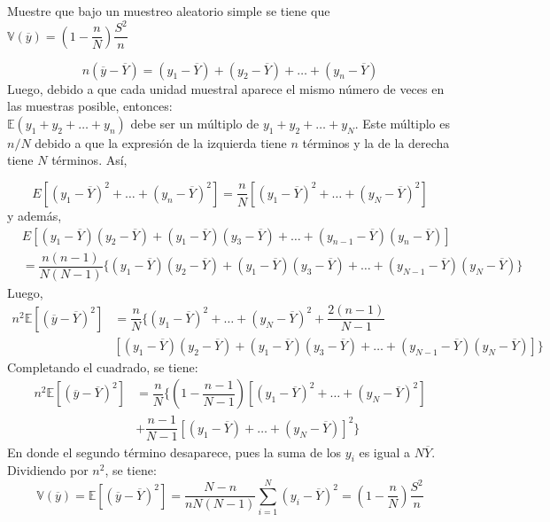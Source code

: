 \addpoints
\question[10] Muestre que bajo un muestreo aleatorio simple se tiene que $\mathbb{V}(\overline{y})=\left(1-\dfrac{n}{N}\right) \dfrac{S^2}{n}$

\begin{solution}
$$n(\overline{y}-\overline{Y})=(y_1-\overline{Y})+(y_2-\overline{Y})+\dots+(y_n-\overline{Y})$$
Luego, debido a que cada unidad muestral aparece el mismo número de veces en las muestras posible, entonces:\\
$\mathbb{E}(y_1+y_2+\dots+y_n)$ debe ser un múltiplo de $y_1+y_2+\dots+y_N$. Este múltiplo es $n/N$ debido a que la expresión de la izquierda tiene $n$ términos y la de la derecha tiene $N$ términos. Así,

$$E\left[(y_1-\overline{Y})^2+\dots+(y_n-\overline{Y})^2\right]=\dfrac{n}{N}\left[(y_1-\overline{Y})^2+\dots+(y_N-\overline{Y})^2\right]$$
y además,
\begin{align*}
&E\left[(y_1-\overline{Y})(y_2-\overline{Y})+(y_1-\overline{Y})(y_3-\overline{Y})+\dots+(y_{n-1}-\overline{Y})(y_n-\overline{Y})\right]\\
&= \dfrac{n(n-1)}{N(N-1)}\bigg\lbrace(y_1-\overline{Y})(y_2-\overline{Y})+(y_1-\overline{Y})(y_3-\overline{Y})+\dots+(y_{N-1}-\overline{Y})(y_N-\overline{Y})\bigg\rbrace
\end{align*}
Luego,
\begin{align*}
n^2\mathbb{E}\left[(\overline{y}-\overline{Y})^2\right]&=\dfrac{n}{N}\bigg\lbrace(y_1-\overline{Y})^2+\dots+(y_N-\overline{Y})^2+\dfrac{2(n-1)}{N-1}\\
&\left[(y_1-\overline{Y})(y_2-\overline{Y})+(y_1-\overline{Y})(y_3-\overline{Y}) + \dots+(y_{N-1}-\overline{Y})(y_N-\overline{Y})\right]\bigg\rbrace
\end{align*}
Completando el cuadrado, se tiene:
\begin{align*}
n^2\mathbb{E}\left[(\overline{y}-\overline{Y})^2\right]&=\dfrac{n}{N}\bigg\lbrace \left(1- \dfrac{n-1}{N-1}\right)\left[(y_1-\overline{Y})^2+\dots+(y_N-\overline{Y})^2\right]\\
&+ \dfrac{n-1}{N-1}\left[(y_1-\overline{Y})+\dots+(y_N-\overline{Y})\right]^2\bigg\rbrace
\end{align*}
En donde el segundo término desaparece, pues la suma de los $y_i$ es igual a $N\overline{Y}$. Dividiendo por $n^2$, se tiene:
$$\mathbb{V}(\overline{y})=\mathbb{E}[(\overline{y}-\overline{Y})^2]=\dfrac{N-n}{nN(N-1)}\sum_{i=1}^{N}(y_i-\overline{Y})^2=\left(1-\dfrac{n}{N}\right)\dfrac{S^2}{n}$$
\end{solution}